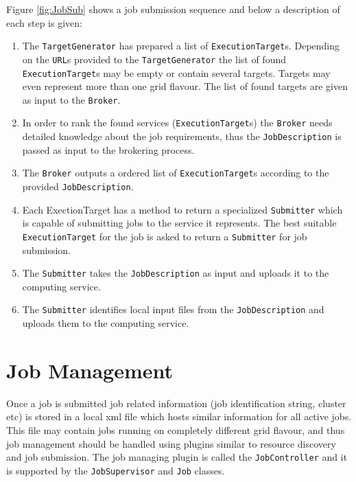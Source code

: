 \documentclass{book}
\newcommand{\TargetGenerator}{\texttt{TargetGenerator}}
\newcommand{\ExecutionTarget}{\texttt{ExecutionTarget}}
\newcommand{\Broker}{\texttt{Broker}}
\newcommand{\Submitter}{\texttt{Submitter}}
\newcommand{\JobDescription}{\texttt{JobDescription}}
\newcommand{\JobSupervisor}{\texttt{JobSupervisor}}
\newcommand{\JobController}{\texttt{JobController}}
\newcommand{\Job}{\texttt{Job}}
\newcommand{\URL}{\texttt{URL}}
\begin{document}
Figure \ref{fig:JobSub} shows a job submission sequence and below a description of each step is given:

\begin{enumerate}
\item{The {\TargetGenerator} has prepared a list of {\ExecutionTarget}s. Depending on the {\URL}s provided to the {\TargetGenerator} the list of 
found {\ExecutionTarget}s may be empty or contain several targets. Targets may even represent more than one grid flavour. The list of 
found targets are given as input to the {\Broker}.}
\item{In order to rank the found services ({\ExecutionTarget}s) the {\Broker} needs detailed knowledge about the job requirements, thus the 
{\JobDescription} is passed as input to the brokering process.}
\item{The {\Broker} outputs a ordered list of {\ExecutionTarget}s according to the provided {\JobDescription}.}
\item{Each ExectionTarget has a method to return a specialized {\Submitter} which is capable of submitting jobs to the service it 
represents. The best suitable {\ExecutionTarget} for the job is asked to return a {\Submitter} for job submission.}
\item{The {\Submitter} takes the {\JobDescription} as input and uploads it to the computing service.}
\item{The {\Submitter} identifies local input files from the {\JobDescription} and uploads them to the computing service.}
\end{enumerate}

\section{Job Management}
Once a job is submitted job related information (job identification string, cluster etc) is stored in a local xml file which hosts 
similar information for all active jobs. This file may contain jobs running on completely different grid flavour, and thus job 
management should be handled using plugins similar to resource discovery and job submission. The job managing plugin is called 
the {\JobController} and it is supported by the {\JobSupervisor} and {\Job} classes.
\end{document}
